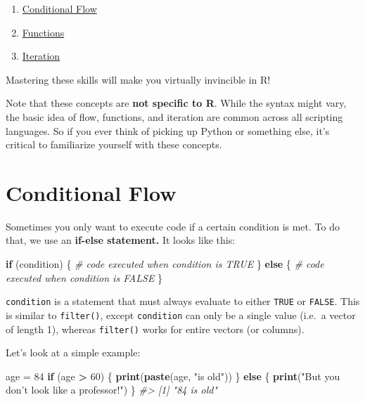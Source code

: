 \documentclass[]{book}
\newenvironment{Shaded}{\begin{snugshade}}{\end{snugshade}}
\newcommand{\KeywordTok}[1]{\textcolor[rgb]{0.13,0.29,0.53}{\textbf{#1}}}
\newcommand{\DecValTok}[1]{\textcolor[rgb]{0.00,0.00,0.81}{#1}}
\newcommand{\StringTok}[1]{\textcolor[rgb]{0.31,0.60,0.02}{#1}}
\newcommand{\CommentTok}[1]{\textcolor[rgb]{0.56,0.35,0.01}{\textit{#1}}}
\newcommand{\ControlFlowTok}[1]{\textcolor[rgb]{0.13,0.29,0.53}{\textbf{#1}}}
\newcommand{\OperatorTok}[1]{\textcolor[rgb]{0.81,0.36,0.00}{\textbf{#1}}}
\newcommand{\NormalTok}[1]{#1}
\providecommand{\tightlist}{%
  \setlength{\itemsep}{0pt}\setlength{\parskip}{0pt}}
\begin{document}
\begin{enumerate}
\def\labelenumi{\arabic{enumi}.}
\tightlist
\item
  \protect\hyperlink{conditional-flow}{Conditional Flow}
\item
  \protect\hyperlink{functions-1}{Functions}
\item
  \protect\hyperlink{iteration}{Iteration}
\end{enumerate}

Mastering these skills will make you virtually invincible in R!

Note that these concepts are \textbf{not specific to R}. While the
syntax might vary, the basic idea of flow, functions, and iteration are
common across all scripting languages. So if you ever think of picking
up Python or something else, it's critical to familiarize yourself with
these concepts.

\hypertarget{conditional-flow}{\section{Conditional
Flow}\label{conditional-flow}}

Sometimes you only want to execute code if a certain condition is met.
To do that, we use an \textbf{if-else statement.} It looks like this:

\begin{Shaded}
\begin{Highlighting}[]
\ControlFlowTok{if}\NormalTok{ (condition) \{}
  \CommentTok{# code executed when condition is TRUE}
\NormalTok{\} }\ControlFlowTok{else}\NormalTok{ \{}
  \CommentTok{# code executed when condition is FALSE}
\NormalTok{\}}
\end{Highlighting}
\end{Shaded}

\texttt{condition} is a statement that must always evaluate to either
\texttt{TRUE} or \texttt{FALSE}. This is similar to \texttt{filter()},
except \texttt{condition} can only be a single value (i.e.~a vector of
length 1), whereas \texttt{filter()} works for entire vectors (or
columns).

Let's look at a simple example:

\begin{Shaded}
\begin{Highlighting}[]
\NormalTok{age =}\StringTok{ }\DecValTok{84}
\ControlFlowTok{if}\NormalTok{ (age }\OperatorTok{>}\StringTok{ }\DecValTok{60}\NormalTok{) \{}
    \KeywordTok{print}\NormalTok{(}\KeywordTok{paste}\NormalTok{(age, }\StringTok{"is old"}\NormalTok{))}
\NormalTok{\} }\ControlFlowTok{else}\NormalTok{ \{}
    \KeywordTok{print}\NormalTok{(}\StringTok{"But you don't look like a professor!"}\NormalTok{)}
\NormalTok{\}}
\CommentTok{#> [1] "84 is old"}
\end{Highlighting}
\end{Shaded}
\end{document}
